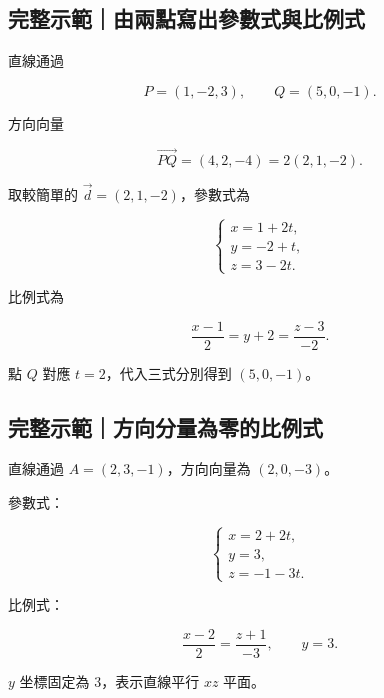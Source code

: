 \documentclass[11pt,a4paper]{article}
\begin{document}
\begin{HandoutWorkedExample}

\subsection{完整示範｜由兩點寫出參數式與比例式}\label{ux5b8cux6574ux793aux7bc4ux7531ux5169ux9edeux5bebux51faux53c3ux6578ux5f0fux8207ux6bd4ux4f8bux5f0f}

直線通過

\[
P=(1,-2,3),\qquad Q=(5,0,-1).
\]

方向向量

\[
\overrightarrow{PQ}=(4,2,-4)=2(2,1,-2).
\]

取較簡單的 \(\vec d=(2,1,-2)\)，參數式為

\[
\boxed{
\begin{cases}
x=1+2t,\\
y=-2+t,\\
z=3-2t.
\end{cases}}
\]

比例式為

\[
\boxed{
\frac{x-1}{2}=y+2=\frac{z-3}{-2}
}.
\]

點 \(Q\) 對應 \(t=2\)，代入三式分別得到 \((5,0,-1)\)。

\end{HandoutWorkedExample}

\begin{HandoutWorkedExample}

\subsection{完整示範｜方向分量為零的比例式}\label{ux5b8cux6574ux793aux7bc4ux65b9ux5411ux5206ux91cfux70baux96f6ux7684ux6bd4ux4f8bux5f0f}

直線通過 \(A=(2,3,-1)\)，方向向量為 \((2,0,-3)\)。

參數式：

\[
\begin{cases}
x=2+2t,\\
y=3,\\
z=-1-3t.
\end{cases}
\]

比例式：

\[
\boxed{
\frac{x-2}{2}=\frac{z+1}{-3},
\qquad y=3
}.
\]

\(y\) 坐標固定為 \(3\)，表示直線平行 \(xz\) 平面。

\end{HandoutWorkedExample}
\end{document}
